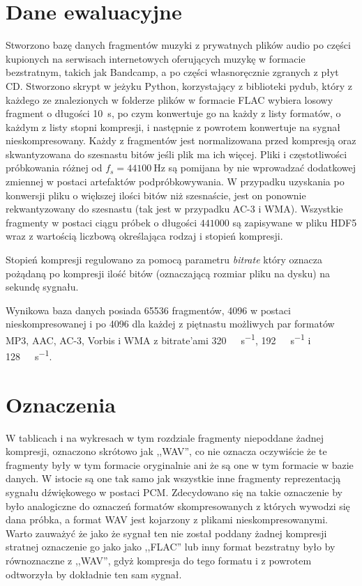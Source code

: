 \documentclass[pl,12pt]{aghdpl}
\let\Oldsection\section%
\renewcommand{\section}{\FloatBarrier\Oldsection}
\begin{document}
\section{Dane ewaluacyjne}
Stworzono bazę danych fragmentów muzyki z prywatnych plików audio po
części kupionych na serwisach internetowych oferujących muzykę w formacie
bezstratnym, takich jak Bandcamp, a po części własnoręcznie zgranych z płyt
CD. Stworzono skrypt w jeżyku Python, korzystający z biblioteki pydub, który
z każdego ze znalezionych w folderze plików w formacie FLAC wybiera losowy
fragment o długości \SI{10}{\second}, po czym konwertuje go na każdy z listy
formatów, o każdym z listy stopni kompresji, i następnie z powrotem konwertuje
na sygnał nieskompresowany. Każdy z fragmentów jest normalizowana przed
kompresją oraz skwantyzowana do szesnastu bitów jeśli plik ma ich więcej. Pliki
i częstotliwości próbkowania różnej od $f_s = \SI{44100}{\hertz}$ są pomijana
by nie wprowadzać dodatkowej zmiennej w postaci artefaktów podpróbkowywania. W
przypadku uzyskania po konwersji pliku o większej ilości bitów niż szesnaście,
jest on ponownie rekwantyzowany do szesnastu (tak jest w przypadku AC-3 i WMA).
Wszystkie fragmenty w postaci ciągu próbek o długości $441000$ są zapisywane w
pliku HDF5 wraz z wartością liczbową określająca rodzaj i stopień kompresji.

Stopień kompresji regulowano za pomocą parametru \textit{bitrate} który oznacza
pożądaną po kompresji ilość bitów (oznaczającą rozmiar pliku na dysku) na
sekundę sygnału.

Wynikowa baza danych posiada 65536 fragmentów, 4096 w postaci
nieskompresowanej i po 4096 dla każdej z piętnastu możliwych par formatów MP3,
AAC, AC-3, Vorbis i WMA z bitrate'ami \SI{320}{\kibi\bit\per\second},
\SI{192}{\kibi\bit\per\second} i \SI{128}{\kibi\bit\per\second}.

\section{Oznaczenia}

W tablicach i na wykresach w tym rozdziale fragmenty niepoddane żadnej kompresji,
oznaczono skrótowo jak ,,WAV'', co nie oznacza oczywiście że te fragmenty były w tym
formacie oryginalnie ani że są one w tym formacie w bazie danych. W istocie są
one tak samo jak wszystkie inne fragmenty reprezentacją sygnału dźwiękowego w
postaci PCM. Zdecydowano się na takie oznaczenie by było analogiczne do
oznaczeń formatów skompresowanych z których wywodzi się dana próbka, a
format WAV jest kojarzony z plikami nieskompresowanymi. Warto zauważyć że jako
że sygnał ten nie został poddany żadnej kompresji stratnej oznaczenie go jako
jako ,,FLAC'' lub inny format bezstratny było by równoznaczne z ,,WAV'', gdyż
kompresja do tego formatu i z powrotem odtworzyła by dokładnie ten sam sygnał.
\end{document}

